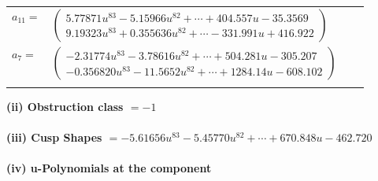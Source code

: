 \documentclass[1p]{elsarticle_modified}
\theoremstyle{definition}
\begin{document}
\begin{tabular}{m{7pt} m{180pt} m{7pt} m{180pt} }
\flushright $a_{11}=$&$\begin{pmatrix}5.77871 u^{83}-5.15966 u^{82}+\cdots+404.557 u-35.3569\\9.19323 u^{83}+0.355636 u^{82}+\cdots-331.991 u+416.922\end{pmatrix}$ \\
\flushright $a_{7}=$&$\begin{pmatrix}-2.31774 u^{83}-3.78616 u^{82}+\cdots+504.281 u-305.207\\-0.356820 u^{83}-11.5652 u^{82}+\cdots+1284.14 u-608.102\end{pmatrix}$\\&\end{tabular}
\flushleft \textbf{(ii) Obstruction class $= -1$}\\~\\
\flushleft \textbf{(iii) Cusp Shapes $= -5.61656 u^{83}-5.45770 u^{82}+\cdots+670.848 u-462.720$}\\~\\
\newpage\renewcommand{\arraystretch}{1}
\flushleft \textbf{(iv) u-Polynomials at the component}\newline \\
\end{document}
